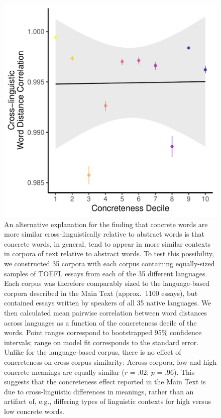 \documentclass[9pt,twoside,lineno]{pnas-new}
\begin{document}
\begin{figure}[h]
\centering
\includegraphics[width=5in]{suppfigs/concreteness_plot_random.pdf}

 \caption{An alternative explanation for the finding that concrete words are more similar cross-linguistically  relative to abstract words is that concrete words, in general, tend to appear in more similar contexts in corpora of text relative to abstract words. To test this possibility, we constructed 35 corpora with each corpus containing equally-sized samples of TOEFL essays  from each of the 35 different languages. Each corpus was therefore comparably sized to the language-based corpora described in the Main Text (approx.\ 1100 essays), but contained essays written by speakers of all 35 native languages. We then calculated mean pairwise correlation between word distances across languages as a function of the concreteness decile of the words. Point ranges correspond to bootstrapped 95\% confidence intervals; range on model fit corresponds to the standard error. Unlike for the language-based corpus, there is no effect of concreteness on cross-corpus similarity: Across corpora, low and high concrete meanings are equally similar ($r$ = .02; $p$ = .96). This suggests that the concreteness effect reported in the Main Text is due to cross-linguistic differences in meanings, rather than an artifact of, e.g., differing types of linguistic contexts for high versus low concrete words. }

\end{figure}
\end{document}
